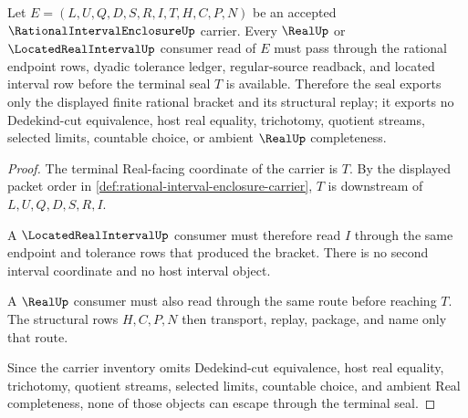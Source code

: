 \begin{theorem}
\label{thm:rational-interval-enclosure-real-seal-nonescape}
Let $E=(L,U,Q,D,S,R,I,T,H,C,P,N)$ be an accepted $\RationalIntervalEnclosureUp$ carrier. Every $\RealUp$ or $\LocatedRealIntervalUp$ consumer read of $E$ must pass through the rational endpoint rows, dyadic tolerance ledger, regular-source readback, and located interval row before the terminal seal $T$ is available. Therefore the seal exports only the displayed finite rational bracket and its structural replay; it exports no Dedekind-cut equivalence, host real equality, trichotomy, quotient streams, selected limits, countable choice, or ambient $\RealUp$ completeness.
\end{theorem}
\begin{proof}
The terminal Real-facing coordinate of the carrier is $T$. By the displayed packet order in \autoref{def:rational-interval-enclosure-carrier}, $T$ is downstream of $L,U,Q,D,S,R,I$.

A $\LocatedRealIntervalUp$ consumer must therefore read $I$ through the same endpoint and tolerance rows that produced the bracket. There is no second interval coordinate and no host interval object.

A $\RealUp$ consumer must also read through the same route before reaching $T$. The structural rows $H,C,P,N$ then transport, replay, package, and name only that route.

Since the carrier inventory omits Dedekind-cut equivalence, host real equality, trichotomy, quotient streams, selected limits, countable choice, and ambient Real completeness, none of those objects can escape through the terminal seal.
\end{proof}




